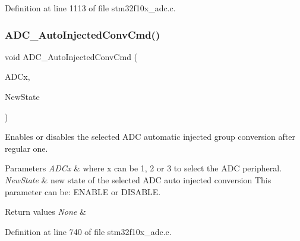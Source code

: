 Definition at line 1113 of file stm32f10x\+\_\+adc.\+c.

\mbox{\label{group___a_d_c___exported___functions_ga1ff9c3b8e4bbdd2addfd227f1a506a66}} 
\subsubsection{\texorpdfstring{A\+D\+C\+\_\+\+Auto\+Injected\+Conv\+Cmd()}{ADC\_AutoInjectedConvCmd()}}
{\footnotesize\ttfamily void A\+D\+C\+\_\+\+Auto\+Injected\+Conv\+Cmd (\begin{DoxyParamCaption}\item[{\hyperlink{struct_a_d_c___type_def}{A\+D\+C\+\_\+\+Type\+Def} $\ast$}]{A\+D\+Cx,  }\item[{\hyperlink{group___exported__types_gac9a7e9a35d2513ec15c3b537aaa4fba1}{Functional\+State}}]{New\+State }\end{DoxyParamCaption})}



Enables or disables the selected A\+DC automatic injected group conversion after regular one. 


\begin{DoxyParams}{Parameters}
{\em A\+D\+Cx} & where x can be 1, 2 or 3 to select the A\+DC peripheral. \\
\hline
{\em New\+State} & new state of the selected A\+DC auto injected conversion This parameter can be\+: E\+N\+A\+B\+LE or D\+I\+S\+A\+B\+LE. \\
\hline
\end{DoxyParams}

\begin{DoxyRetVals}{Return values}
{\em None} & \\
\hline
\end{DoxyRetVals}


Definition at line 740 of file stm32f10x\+\_\+adc.\+c.

\mbox{\label{group___a_d_c___exported___functions_gaf34f36798f811b4a41321ea2d12118d4}} 
